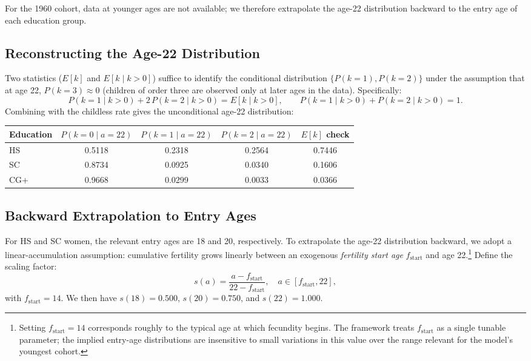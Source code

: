 For the 1960 cohort, data at younger ages are not available; we therefore extrapolate the age-22 distribution backward to the entry age of each education group.

\subsection{Reconstructing the Age-22 Distribution}

Two statistics ($E[k]$ and $E[k \mid k > 0]$) suffice to identify the conditional distribution $\{P(k=1), P(k=2)\}$ under the assumption that at age 22, $P(k=3) \approx 0$ (children of order three are observed only at later ages in the data). Specifically:
\[
P(k=1 \mid k > 0) + 2 \, P(k=2 \mid k > 0) = E[k \mid k > 0], \qquad P(k=1 \mid k > 0) + P(k=2 \mid k > 0) = 1.
\]
Combining with the childless rate gives the unconditional age-22 distribution:

\begin{center}
\begin{tabular}{lcccc}
\toprule
Education & $P(k=0 \mid a=22)$ & $P(k=1 \mid a=22)$ & $P(k=2 \mid a=22)$ & $E[k]$ check \\
\midrule
HS  & 0.5118 & 0.2318 & 0.2564 & 0.7446 \\
SC  & 0.8734 & 0.0925 & 0.0340 & 0.1606 \\
CG+ & 0.9668 & 0.0299 & 0.0033 & 0.0366 \\
\bottomrule
\end{tabular}
\end{center}

\subsection{Backward Extrapolation to Entry Ages}

For HS and SC women, the relevant entry ages are 18 and 20, respectively. To extrapolate the age-22 distribution backward, we adopt a linear-accumulation assumption: cumulative fertility grows linearly between an exogenous \emph{fertility start age} $f_{\text{start}}$ and age 22.\footnote{Setting $f_{\text{start}} = 14$ corresponds roughly to the typical age at which fecundity begins. The framework treats $f_{\text{start}}$ as a single tunable parameter; the implied entry-age distributions are insensitive to small variations in this value over the range relevant for the model's youngest cohort.} Define the scaling factor:
\[
s(a) = \frac{a - f_{\text{start}}}{22 - f_{\text{start}}}, \quad a \in [f_{\text{start}}, 22],
\]
with $f_{\text{start}} = 14$. We then have $s(18) = 0.500$, $s(20) = 0.750$, and $s(22) = 1.000$.

